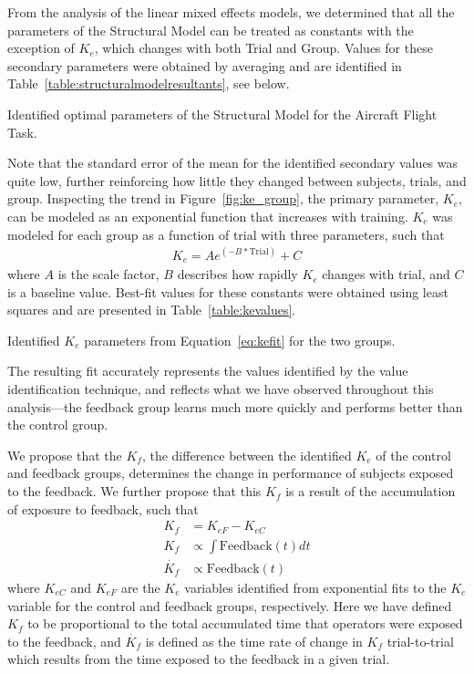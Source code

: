From the analysis of the linear mixed effects models, we determined that all the parameters of the Structural Model can be treated as constants with the exception of $K_e$, which changes with both Trial and Group.
Values for these secondary parameters were obtained by averaging and are identified in Table~\ref{table:structuralmodelresultants}, see below.
\begin{table}[tb]
    \centering
    \caption[Identified optimal parameters of the Structural Model for the Aircraft Flight Task]{Identified optimal parameters of the Structural Model for the Aircraft Flight Task.}
    \label{table:structuralmodelresultants}
\end{table}
Note that the standard error of the mean for the identified secondary values was quite low, further reinforcing how little they changed between subjects, trials, and group.
Inspecting the trend in Figure~\ref{fig:ke_group}, the primary parameter, $K_e$, can be modeled as an exponential function that increases with training.
$K_e$ was modeled for each group as a function of trial with three parameters, such that
\begin{align} \label{eq:kefit}
    K_e = A e^{(-B*\mbox{Trial})}+C
\end{align}
where $A$ is the scale factor, $B$ describes how rapidly $K_e$ changes with trial, and $C$ is a baseline value.
Best-fit values for these constants were obtained using least squares and are presented in Table~\ref{table:kevalues}.
\begin{table}[tb]
    \centering
    \caption[Identified $K_e$ parameters for the two groups]{Identified $K_e$ parameters from Equation~\ref{eq:kefit} for the two groups.}
    \label{table:kevalues}
\end{table}
The resulting fit accurately represents the values identified by the value identification technique, and reflects what we have observed throughout this analysis---the feedback group learns much more quickly and performs better than the control group.

We propose that the $K_f$, the difference between the identified $K_e$ of the control and feedback groups, determines the change in performance of subjects exposed to the feedback.
We further propose that this $K_f$ is a result of the accumulation of exposure to feedback, such that
\begin{align}
    K_f       & = K_{eF} - K_{eC}                  \\
    K_f       & \propto \int \mbox{Feedback}(t) dt \\
    \dot{K_f} & \propto \mbox{Feedback}(t)
\end{align}
where $K_{eC}$ and $K_{eF}$ are the $K_e$ variables identified from exponential fits to the $K_e$ variable for the control and feedback groups, respectively.
Here we have defined $K_f$ to be proportional to the total accumulated time that operators were exposed to the feedback, and $\dot{K_f}$ is defined as the time rate of change in $K_f$ trial-to-trial which results from the time exposed to the feedback in a given trial.

